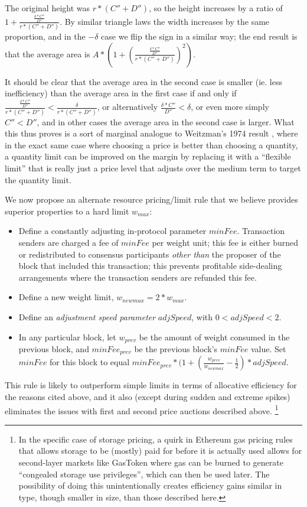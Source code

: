 \documentclass[12pt, final]{article}
\begin{document}
The original height was $r * (C'' + D'')$, so the height increases by a ratio of $1 + \frac{\frac{\delta * C''}{D''}}{r * (C'' + D'')}$. By similar triangle laws the width increases by the same proportion, and in the $-\delta$ case we flip the sign in a similar way; the end result is that the average area is $A * (1 + (\frac{\frac{\delta * C''}{D''}}{r * (C'' + D'')})^2)$.

It should be clear that the average area in the second case is smaller (ie. less inefficiency) than the average area in the first case if and only if $\frac{\frac{\delta * C''}{D''}}{r * (C'' + D'')} < \frac{\delta}{r * (C'' + D'')}$, or alternatively $\frac{\delta * C''}{D''} < \delta$, or even more simply $C'' < D''$, and in other cases the average area in the second case is larger. What this thus proves is a sort of marginal analogue to Weitzman's 1974 result \cite{weitzman1974prices}, where in the exact same case where choosing a price is better than choosing a quantity, a quantity limit can be improved on the margin by replacing it with a ``flexible limit'' that is really just a price level that adjusts over the medium term to target the quantity limit.

We now propose an alternate resource pricing/limit rule that we believe provides superior properties to a hard limit $w_{max}$:

\begin{itemize}
\item Define a constantly adjusting in-protocol parameter $minFee$. Transaction senders are charged a fee of $minFee$ per weight unit; this fee is either burned or redistributed to consensus participants \emph{other than} the proposer of the block that included this transaction; this prevents profitable side-dealing arrangements where the transaction senders are refunded this fee.
\item Define a new weight limit, $w_{newmax} = 2 * w_{max}$.
\item Define an \emph{adjustment speed parameter} $adjSpeed$, with $0 < adjSpeed < 2$.
\item In any particular block, let $w_{prev}$ be the amount of weight consumed in the previous block, and $minFee_{prev}$ be the previous block's $minFee$ value. Set $minFee$ for this block to equal $minFee_{prev} * (1 + (\frac{w_{prev}}{w_{newmax}} - \frac{1}{2}) * adjSpeed$.
\end{itemize}

This rule is likely to outperform simple limits in terms of allocative efficiency for the reasons cited above, and it also (except during sudden and extreme spikes) eliminates the issues with first and second price auctions described above. \footnote{In the specific case of storage pricing, a quirk in Ethereum gas pricing rules that allows storage to be (mostly) paid for before it is actually used allows for second-layer markets like GasToken\cite{gastoken} where gas can be burned to generate ``congealed storage use privileges'', which can then be used later. The possibility of doing this unintentionally creates efficiency gains similar in type, though smaller in size, than those described here.}
\end{document}
